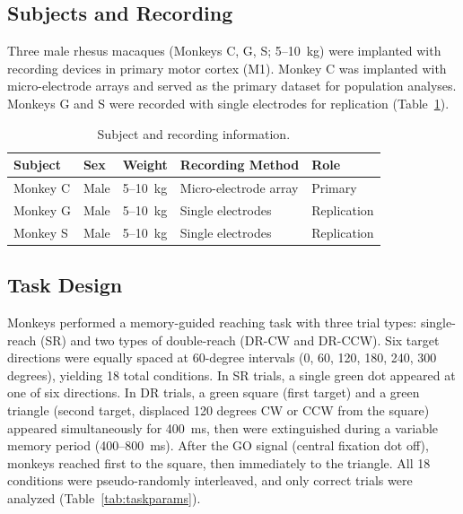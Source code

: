 \documentclass[12pt]{article}
\begin{document}
\subsection{Subjects and Recording}

Three male rhesus macaques (Monkeys C, G, S; 5--10~kg) were implanted with recording devices in primary motor cortex (M1). Monkey C was implanted with micro-electrode arrays and served as the primary dataset for population analyses. Monkeys G and S were recorded with single electrodes for replication (Table~\ref{tab:subjects}).

\begin{table}[ht]
\centering
\caption{Subject and recording information.}
\label{tab:subjects}
\begin{tabular}{lllll}
\toprule
Subject & Sex & Weight & Recording Method & Role \\
\midrule
Monkey C & Male & 5--10~kg & Micro-electrode array & Primary \\
Monkey G & Male & 5--10~kg & Single electrodes & Replication \\
Monkey S & Male & 5--10~kg & Single electrodes & Replication \\
\bottomrule
\end{tabular}
\end{table}

\subsection{Task Design}

Monkeys performed a memory-guided reaching task with three trial types: single-reach (SR) and two types of double-reach (DR-CW and DR-CCW). Six target directions were equally spaced at 60-degree intervals (0, 60, 120, 180, 240, 300 degrees), yielding 18 total conditions. In SR trials, a single green dot appeared at one of six directions. In DR trials, a green square (first target) and a green triangle (second target, displaced 120 degrees CW or CCW from the square) appeared simultaneously for 400~ms, then were extinguished during a variable memory period (400--800~ms). After the GO signal (central fixation dot off), monkeys reached first to the square, then immediately to the triangle. All 18 conditions were pseudo-randomly interleaved, and only correct trials were analyzed (Table~\ref{tab:taskparams}).
\end{document}
